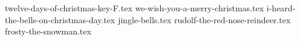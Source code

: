\documentclass[letterpaper]{article}
\begin{document}

\begin{songs}{}

{twelve-days-of-christmas-key-F.tex}
{we-wish-you-a-merry-christmas.tex}
{i-heard-the-bells-on-christmas-day.tex}
{jingle-bells.tex}
{rudolf-the-red-nose-reindeer.tex}
{frosty-the-snowman.tex}

\begin{comment}
\end{comment}

\end{songs}
\end{document}
